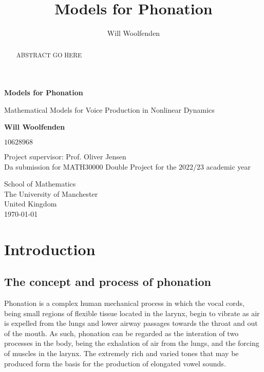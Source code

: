 \documentclass{report}
\title{Models for Phonation}
\author{Will Woolfenden}
\begin{document}
\begin{titlepage}
    \begin{center}
        \vspace*{1cm}
            
        \Huge
        \textbf{Models for Phonation}
            
        \vspace{0.5cm}
        \LARGE
        Mathematical Models for Voice Production in Nonlinear Dynamics
            
        \vspace{1.5cm}
            
        \textbf{Will Woolfenden}
        
        \vspace{0.5cm}
        
        $10628968$
            
        \vfill

        Project supervisor: Prof. Oliver Jensen \\

        \vspace{0.8cm}
        Da submission for MATH30000 Double Project for the $2022/23$ academic year
            
        \vspace{0.8cm}
            
        \Large

        School of Mathematics\\
        The University of Manchester\\
        United Kingdom\\
        \today
    \end{center}
\end{titlepage}

\begin{abstract}
    ABSTRACT GO HERE
\end{abstract}

\chapter{Introduction}

\section{The concept and process of phonation}

Phonation is a complex human mechanical process in which the vocal cords, being small regions of flexible tissue located in the larynx,
begin to vibrate as air is expelled from the lungs and lower airway passages towards the throat and out of the mouth.
As such, phonation can be regarded as the interation of two processes in the body,
being the exhalation of air from the lungs,
and the forcing of muscles in the larynx.
The extremely rich and varied tones that may be produced form the basis for the production of elongated vowel sounds.
\end{document}
